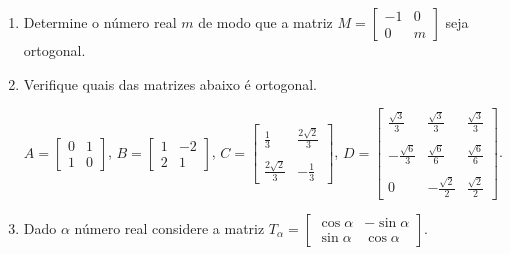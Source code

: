 \documentclass{report}
\begin{document}
\begin{Exercise}
\begin{enumerate}
\item \label{1lista15} Determine o número real $m$ de modo que a
matriz $ M=\left[
\begin{array}{rr}
-1 & 0 \\
0 & m
\end{array}
\right]$ seja ortogonal.


\item \label{1lista16} Verifique quais das matrizes abaixo é
ortogonal.

$ A=\left[
\begin{array}{rr}
0 & 1 \\
1 & 0
\end{array}
\right]$,  \hspace{0.7cm} $B=\left[
\begin{array}{rr}
1 & -2 \\
2 & 1
\end{array}
\right]$, \hspace{0.7cm} $C=\left[
\begin{array}{cc}
\frac{1}{3} & \frac{2\sqrt{2}}{3} \\
&  \\
\frac{2\sqrt{2}}{3} & -\frac{1}{3}
\end{array}
\right]$, \hspace{0.7cm} $D=\left[
\begin{array}{rrr}
\frac{\sqrt{3}}{3} & \frac{\sqrt{3}}{3} & \frac{\sqrt{3}}{3} \\
& & \\
-\frac{\sqrt{6}}{3} & \frac{\sqrt{6}}{6} & \frac{\sqrt{6}}{6} \\
& & \\
0 & -\frac{\sqrt{2}}{2} & \frac{\sqrt{2}}{2}
\end{array}
\right]$.


\item \label{1lista17} Dado $\alpha$ número real considere a
matriz $T_\alpha=\left[
\begin{array}{rr}
\cos \alpha & -\sin \alpha \\
\sin \alpha & \cos \alpha
\end{array}
\right]$.


\end{enumerate}
\end{Exercise}
\end{document}
